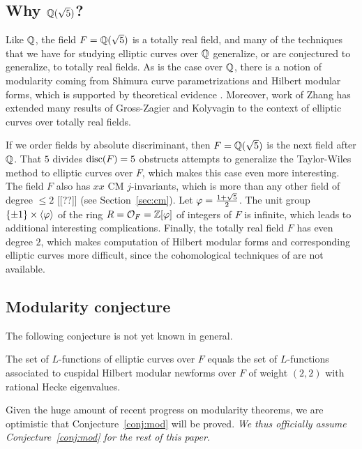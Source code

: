 \documentclass{amsart}
\begin{document}
\subsection{Why $\mathbb{Q}(\sqrt{5})$?}

Like $\mathbb{Q}$, the field $F=\mathbb{Q}(\sqrt{5})$ is a totally real field, and
many of the techniques that we have for studying elliptic curves over
$\mathbb{Q}$ generalize, or are conjectured to generalize, to totally real
fields.
As is the case over $\mathbb{Q}$, there is a 
notion of modularity coming from Shimura curve
parametrizations and Hilbert modular forms, which is supported by
theoretical evidence \cite{}.%
Moreover,  work \cite{zhang:heightsshimura} of Zhang has extended many results
of Gross-Zagier \cite{gross-zagier} and Kolyvagin \cite{kolyvagin:mordellweil} 
to the context of elliptic curves over totally real fields.

If we order fields by absolute discriminant, then $F=\mathbb{Q}(\sqrt{5})$ is
the next field after $\mathbb{Q}$.  That $5$ divides $\operatorname{disc}(F)=5$ obstructs
attempts to generalize the Taylor-Wiles method to elliptic curves over
$F$, which makes this case even more interesting.  The field $F$ also
has $xx$ CM $j$-invariants, which is more than any other field of
degree $\leq 2$ [[??]] (see Section~\ref{sec:cm}).  Let
$\varphi=\frac{1+\sqrt{5}}{2}$.  The unit group $\{\pm 1\} \times
\langle \varphi \rangle$ of the ring $R=\mathcal{O}_F=\mathbb{Z}[\varphi]$ of integers of
$F$ is infinite, which leads to additional interesting complications.
Finally, the totally real field $F$ has even degree $2$, which makes
computation of Hilbert modular forms and corresponding elliptic curves
more difficult, since the cohomological techniques of \cite{} are not
available.  


\subsection{Modularity conjecture}\label{sec:mod}
The following conjecture is not yet known in general. 
\begin{conjecture}[Modularity]\label{conj:mod}
  The set of $L$-functions of elliptic curves over $F$ equals the set
  of $L$-functions associated to cuspidal Hilbert modular newforms
  over $F$ of weight $(2,2)$ with rational Hecke eigenvalues.
\end{conjecture}
Given the huge amount of recent progress on modularity theorems, we
are optimistic that Conjecture~\ref{conj:mod} will be proved.  {\em We thus
officially assume Conjecture~\ref{conj:mod}  for the rest of this paper.}
\end{document}
